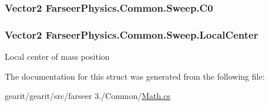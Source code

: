 \hypertarget{struct_farseer_physics_1_1_common_1_1_sweep_ad87be96d9955ee6c1b096820218d5abe}{
\subsubsection[{C0}]{\setlength{\rightskip}{0pt plus 5cm}Vector2 Farseer\+Physics.\+Common.\+Sweep.\+C0}}\label{struct_farseer_physics_1_1_common_1_1_sweep_ad87be96d9955ee6c1b096820218d5abe}
\hypertarget{struct_farseer_physics_1_1_common_1_1_sweep_aee5495c8f6ce3ded48b6e0b812dac58b}{
\subsubsection[{Local\+Center}]{\setlength{\rightskip}{0pt plus 5cm}Vector2 Farseer\+Physics.\+Common.\+Sweep.\+Local\+Center}}\label{struct_farseer_physics_1_1_common_1_1_sweep_aee5495c8f6ce3ded48b6e0b812dac58b}


Local center of mass position 



The documentation for this struct was generated from the following file\+:\begin{DoxyCompactItemize}
\item 
gearit/gearit/src/farseer 3./\+Common/\hyperlink{_math_8cs}{Math.\+cs}\end{DoxyCompactItemize}
